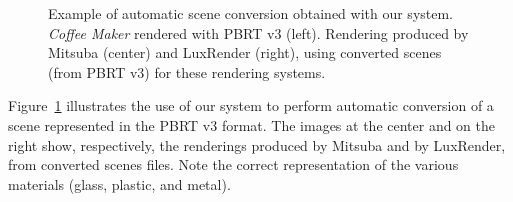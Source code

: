 \begin{figure}[h]
  \centering
  \caption{Example of automatic scene conversion obtained with our system. \textit{Coffee Maker} rendered with PBRT v3 (left). Rendering produced by Mitsuba (center) and LuxRender (right), using converted scenes (from PBRT v3) for these rendering systems.}
  \label{fig:teaser}
\end{figure}

Figure~\ref{fig:teaser} illustrates the use of our system to perform automatic conversion of a scene represented in the PBRT v3 format. The images at the center and on the right show, respectively, the renderings produced by Mitsuba and by LuxRender, from converted scenes files. Note the correct representation of the various materials (glass, plastic, and metal).

